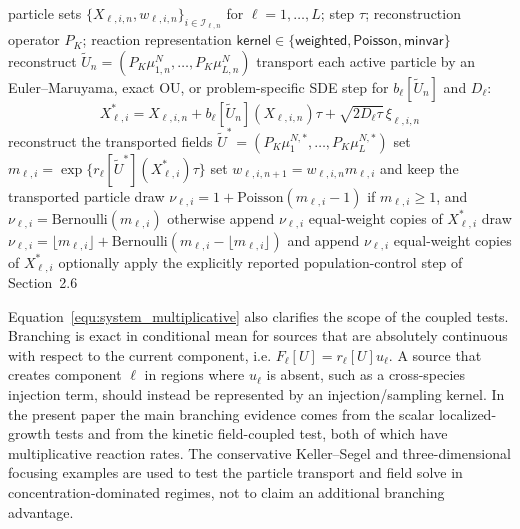\documentclass[a4paper,fleqn]{cas-sc}
\theoremstyle{definition}
\theoremstyle{remark}
\begin{document}
\begin{algorithm}[t]
\caption{One split step for a coupled finite-measure system}
\label{alg:system_step}
\begin{algorithmic}[1]
\Require particle sets $\{X_{\ell,i,n},w_{\ell,i,n}\}_{i\in\mathcal I_{\ell,n}}$ for $\ell=1,\ldots,L$; step $\tau$; reconstruction operator $P_K$; reaction representation $\mathsf{kernel}\in\{\mathsf{weighted},\mathsf{Poisson},\mathsf{minvar}\}$
\State reconstruct $\widetilde U_n=(P_K\mu_{1,n}^N,\ldots,P_K\mu_{L,n}^N)$
\State transport each active particle by an Euler--Maruyama, exact OU, or problem-specific SDE step for $b_\ell[\widetilde U_n]$ and $D_\ell$:
\[
X^*_{\ell,i}=X_{\ell,i,n}+b_\ell[\widetilde U_n](X_{\ell,i,n})\tau+\sqrt{2D_\ell\tau}\,\xi_{\ell,i,n}
\]
\EndFor
\State reconstruct the transported fields $\widetilde U^*=(P_K\mu_{1}^{N,*},\ldots,P_K\mu_L^{N,*})$
\State set $m_{\ell,i}=\exp\{r_\ell[\widetilde U^*](X^*_{\ell,i})\tau\}$
\State set $w_{\ell,i,n+1}=w_{\ell,i,n}m_{\ell,i}$ and keep the transported particle
\State draw $\nu_{\ell,i}=1+\mathrm{Poisson}(m_{\ell,i}-1)$ if $m_{\ell,i}\ge 1$, and $\nu_{\ell,i}=\mathrm{Bernoulli}(m_{\ell,i})$ otherwise
\State append $\nu_{\ell,i}$ equal-weight copies of $X^*_{\ell,i}$
\Else
\State draw $\nu_{\ell,i}=\lfloor m_{\ell,i}\rfloor+\mathrm{Bernoulli}(m_{\ell,i}-\lfloor m_{\ell,i}\rfloor)$ and append $\nu_{\ell,i}$ equal-weight copies of $X^*_{\ell,i}$
\EndIf
\EndFor
\State optionally apply the explicitly reported population-control step of Section~2.6
\end{algorithmic}
\end{algorithm}

Equation~\eqref{equ:system_multiplicative} also clarifies the scope of the coupled tests.  Branching is exact in conditional mean for sources that are absolutely continuous with respect to the current component, i.e. $F_\ell[U]=r_\ell[U]u_\ell$.  A source that creates component $\ell$ in regions where $u_\ell$ is absent, such as a cross-species injection term, should instead be represented by an injection/sampling kernel.  In the present paper the main branching evidence comes from the scalar localized-growth tests and from the kinetic field-coupled test, both of which have multiplicative reaction rates.  The conservative Keller--Segel and three-dimensional focusing examples are used to test the particle transport and field solve in concentration-dominated regimes, not to claim an additional branching advantage.
\end{document}
